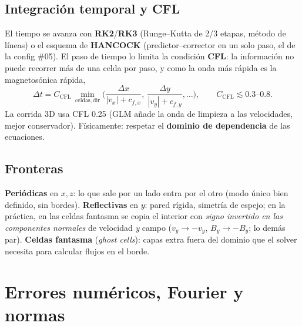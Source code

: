 \documentclass[11pt,a4paper]{article}
\newcommand{\term}[1]{\textbf{#1}}
\begin{document}
\subsection{Integración temporal y CFL}

El tiempo se avanza con \term{RK2}/\term{RK3} (Runge--Kutta de 2/3 etapas, método de
líneas) o el esquema de \term{HANCOCK} (predictor--corrector en un solo paso, el de la
config \#05). El paso de tiempo lo limita la condición \term{CFL}: la información no puede
recorrer más de una celda por paso, y como la onda más rápida es la magnetosónica rápida,
\begin{equation}
\Delta t = C_\mathrm{CFL}\,\min_\mathrm{celdas,dir}\Big(\frac{\Delta x}{|v_x|+c_{f,x}},
\ \frac{\Delta y}{|v_y|+c_{f,y}},\dots\Big),
\qquad C_\mathrm{CFL}\lesssim 0.3\text{--}0.8 .
\end{equation}
La corrida 3D usa CFL 0.25 (GLM añade la onda de limpieza a las velocidades, mejor
conservador). Físicamente: respetar el \term{dominio de dependencia} de las ecuaciones.

\subsection{Fronteras}

\term{Periódicas} en $x,z$: lo que sale por un lado entra por el otro (modo único bien
definido, sin bordes). \term{Reflectivas} en $y$: pared rígida, simetría de espejo; en la
práctica, en las celdas fantasma se copia el interior con \emph{signo invertido en las
componentes normales} de velocidad \emph{y} campo ($v_y\to-v_y$, $B_y\to-B_y$; lo demás
par). \term{Celdas fantasma} (\emph{ghost cells}): capas extra fuera del dominio que el
solver necesita para calcular flujos en el borde.

\section{Errores numéricos, Fourier y normas}
\label{sec:fourier}
\end{document}
